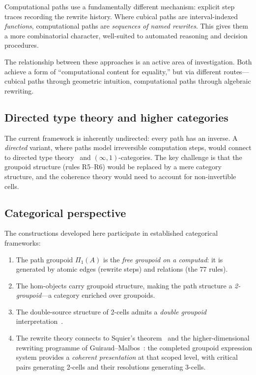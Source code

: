 \documentclass[manuscript]{BSLstyle}
\begin{document}
Computational paths use a fundamentally different mechanism: explicit step
traces recording the rewrite history.  Where cubical paths are
interval-indexed \emph{functions}, computational paths are
\emph{sequences of named rewrites}.  This gives them a more combinatorial
character, well-suited to automated reasoning and decision procedures.

The relationship between these approaches is an active area of
investigation.  Both achieve a form of ``computational content for
equality,'' but via different routes---cubical paths through geometric
intuition, computational paths through algebraic rewriting.

\subsection{Directed type theory and higher categories}

The current framework is inherently undirected: every path has an
inverse.  A \emph{directed} variant, where paths model irreversible
computation steps, would connect to directed type
theory~\cite{RiehlShulman17} and $(\infty, 1)$-categories.  The key
challenge is that the groupoid structure (rules R5--R6) would be
replaced by a mere category structure, and the coherence theory would
need to account for non-invertible cells.

\subsection{Categorical perspective}

The constructions developed here participate in established
categorical frameworks:

\begin{enumerate}
\item The path groupoid $\Pi_1(A)$ is the \emph{free groupoid on a
  computad}: it is generated by atomic edges (rewrite steps) and
  relations (the 77 rules).

\item The hom-objects carry groupoid structure, making the path
  structure a \emph{2-groupoid}---a category enriched over groupoids.

\item The double-source structure of 2-cells admits a \emph{double
  groupoid} interpretation~\cite{BrownSpencer76}.

\item The rewrite theory connects to Squier's theorem~\cite{Squier87}
  and the higher-dimensional rewriting programme of
  Guiraud--Malbos~\cite{GuiraudMalbos09}: the completed groupoid expression
  system provides a \emph{coherent presentation} at that scoped level, with
  critical pairs generating 2-cells and their resolutions generating 3-cells.
\end{enumerate}
\end{document}
